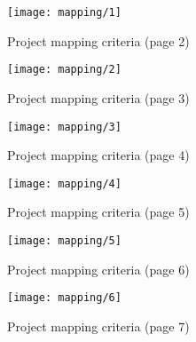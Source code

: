 \begin{figure}[H]
  \centering
  \texttt{[image: mapping/1]}
  \caption{Project mapping criteria (page 2)}
  \label{fig:mapping:1}
\end{figure}

\begin{figure}[H]
  \centering
  \texttt{[image: mapping/2]}
  \caption{Project mapping criteria (page 3)}
  \label{fig:mapping:2}
\end{figure}

\begin{figure}[H]
  \centering
  \texttt{[image: mapping/3]}
  \caption{Project mapping criteria (page 4)}
  \label{fig:mapping:3}
\end{figure}

\begin{figure}[H]
  \centering
  \texttt{[image: mapping/4]}
  \caption{Project mapping criteria (page 5)}
  \label{fig:mapping:4}
\end{figure}

\begin{figure}[H]
  \centering
  \texttt{[image: mapping/5]}
  \caption{Project mapping criteria (page 6)}
  \label{fig:mapping:5}
\end{figure}

\begin{figure}[H]
  \centering
  \texttt{[image: mapping/6]}
  \caption{Project mapping criteria (page 7)}
  \label{fig:mapping:6}
\end{figure}
